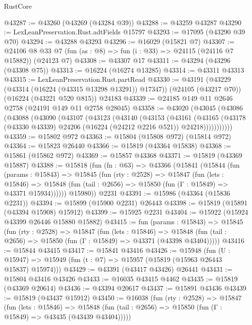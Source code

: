 \begin{lexlean}{RustCore}
\begin{coremodule}
@43287 := @43260 (@43269 (@43284 @39))
@43288 := @43259 @43287
@43290 := LexLeanPreservation.Rust.adtFields @15797
@43293 := @17095 (@43290 @39 @70)
@43294 := @43288 @43293
@43296 := @16029 (@15821 @7)
@43307 := @24106 @8 @33 @7 (fun (as : @8) => fun (i : @33) => @24115 (@24116 @7 @15882)) (@24123 @7)
@43308 := @43307 @17
@43311 := @43294 (@43296 (@43308 @75))
@43313 := @16224 (@16274 @13285)
@43314 := @43311 @43313
@43315 := LexLeanPreservation.Rust.partRead
@43330 := @43191
    (@43229 (@43314 (@16224 (@43315 @13298 @13291)) @17347))
    (@24105 (@43217 @70))
    (@16224 (@43221 @520 @815))
    @24183
@43339 := @24185 @149 @11 @2646 @2758 (@24191 @149 @11 @2758 @28045)
@43358 := @43020
    (@43045
      (@43086
        (@43088
          (@43090
            (@43107
              (@43123
                (@43140
                  (@43153
                    (@43161
                      (@43165
                        (@43178
                          (@43330 @43339)
                          @24206
                          (@16224 (@24212 @2216 @521))
                          @24218)))))))))))
@43359 := @15802 @972
@43363 := @15804 (@15808 @972) (@15814 @972)
@43364 := @15823 @26440
@43366 := @15819 (@43364 @15838)
@43368 := @15861 (@15862 @972)
@43369 := @15857 @43368
@43371 := @15819 (@43369 @15887)
@43388 := @15818
    (fun (fn : @63) =>
    @43366
      (@15841
        (@15844
          (fun (params : @15843) =>
          @15845
            (fun (rty : @2528) =>
            @15847
              (fun (lets : @15846) =>
              @15848 (fun (tail : @2656) => @15850 (fun (Γ : @15849) => @43371 @15934))))))
        @15980))
    @2231
@43391 := @15986 (@43364 (@15836 @2231))
@43394 := @15899 (@15900 @2231) @26443
@43398 := @15819 (@15891 (@43394 @15908) @15912)
@43399 := @15925 @2231
@43404 := @15922 (@15924 @43399 @26446 @15880 @15882)
@43415 := fun (params : @15843) =>
  @15845
    (fun (rty : @2528) =>
    @15847
      (fun (lets : @15846) =>
      @15848 (fun (tail : @2656) => @15850 (fun (Γ : @15849) => @43371 (@43398 @43404)))))
@43416 := @15844 @43415
@43417 := @15841 @43416
@43426 := @15948
    (fun (U : @15947) => @15949 (fun (t : @7) => @15957 (@15819 (@15963 @26443 @15837) @15974)))
@43429 := @43391 (@43417 @43426) @26441
@43431 := @15804 @43416 @43426
@43433 := @16035 @43415 @4462
@43435 := @15819 (@43369 @20614)
@43436 := @43394 @20617
@43437 := @15891 @43436
@43439 := @15819 (@43437 @15912)
@43450 := @16038
    (fun (rty : @2528) =>
    @15847
      (fun (lets : @15846) =>
      @15848 (fun (tail : @2656) => @15850 (fun (Γ : @15849) => @43435 (@43439 @43404)))))

\end{coremodule}
\end{lexlean}

